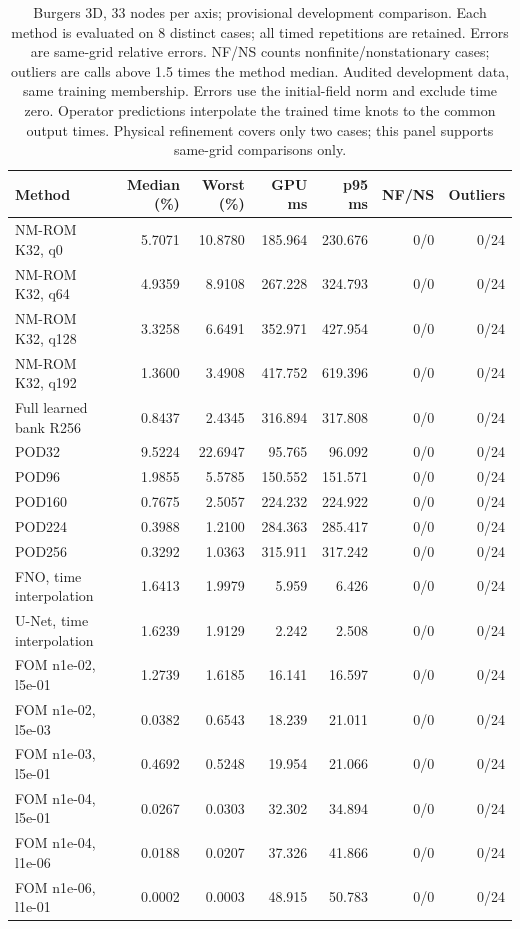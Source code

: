 \begin{table}[htbp]
\centering
\small
\setlength{\tabcolsep}{3pt}
\begin{tabular}{lrrrrrr}
\toprule
Method & Median (\%) & Worst (\%) & GPU ms & p95 ms & NF/NS & Outliers \\
\midrule
NM-ROM K32, q0 & 5.7071 & 10.8780 & 185.964 & 230.676 & 0/0 & 0/24 \\
NM-ROM K32, q64 & 4.9359 & 8.9108 & 267.228 & 324.793 & 0/0 & 0/24 \\
NM-ROM K32, q128 & 3.3258 & 6.6491 & 352.971 & 427.954 & 0/0 & 0/24 \\
NM-ROM K32, q192 & 1.3600 & 3.4908 & 417.752 & 619.396 & 0/0 & 0/24 \\
Full learned bank R256 & 0.8437 & 2.4345 & 316.894 & 317.808 & 0/0 & 0/24 \\
POD32 & 9.5224 & 22.6947 & 95.765 & 96.092 & 0/0 & 0/24 \\
POD96 & 1.9855 & 5.5785 & 150.552 & 151.571 & 0/0 & 0/24 \\
POD160 & 0.7675 & 2.5057 & 224.232 & 224.922 & 0/0 & 0/24 \\
POD224 & 0.3988 & 1.2100 & 284.363 & 285.417 & 0/0 & 0/24 \\
POD256 & 0.3292 & 1.0363 & 315.911 & 317.242 & 0/0 & 0/24 \\
FNO, time interpolation & 1.6413 & 1.9979 & 5.959 & 6.426 & 0/0 & 0/24 \\
U-Net, time interpolation & 1.6239 & 1.9129 & 2.242 & 2.508 & 0/0 & 0/24 \\
FOM n1e-02, l5e-01 & 1.2739 & 1.6185 & 16.141 & 16.597 & 0/0 & 0/24 \\
FOM n1e-02, l5e-03 & 0.0382 & 0.6543 & 18.239 & 21.011 & 0/0 & 0/24 \\
FOM n1e-03, l5e-01 & 0.4692 & 0.5248 & 19.954 & 21.066 & 0/0 & 0/24 \\
FOM n1e-04, l5e-01 & 0.0267 & 0.0303 & 32.302 & 34.894 & 0/0 & 0/24 \\
FOM n1e-04, l1e-06 & 0.0188 & 0.0207 & 37.326 & 41.866 & 0/0 & 0/24 \\
FOM n1e-06, l1e-01 & 0.0002 & 0.0003 & 48.915 & 50.783 & 0/0 & 0/24 \\
\bottomrule
\end{tabular}
\caption{Burgers 3D, 33 nodes per axis; provisional development comparison. Each method is evaluated on 8 distinct cases; all timed repetitions are retained. Errors are same-grid relative errors. NF/NS counts nonfinite/nonstationary cases; outliers are calls above 1.5 times the method median. Audited development data, same training membership. Errors use the initial-field norm and exclude time zero. Operator predictions interpolate the trained time knots to the common output times. Physical refinement covers only two cases; this panel supports same-grid comparisons only.}
\label{tab:burgers3d-b3d003-n33}
\end{table}
